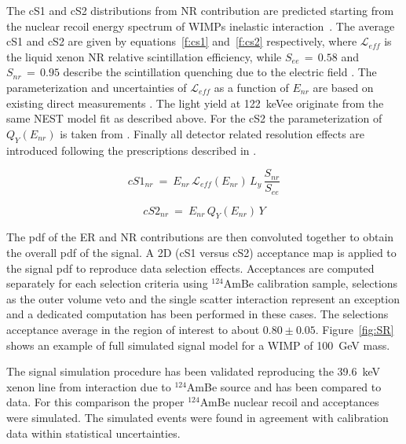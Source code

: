 The cS1 and cS2 distributions from NR contribution are predicted starting from the nuclear recoil energy spectrum
of WIMPs inelastic interaction~\cite{inelastic_th}. The average cS1 and cS2 are given by equations~\ref{f:cs1} and~\ref{f:cs2} respectively,
where $\mathcal{L}_{eff}$ is the liquid xenon NR relative scintillation efficiency, while $S_{ee} \, = \, 0.58$  and $S_{nr} \, = \, 0.95$ describe the scintillation 
quenching due to the electric field \cite{ScintQuenching}. The parameterization and uncertainties of $\mathcal{L}_{eff}$ as a function of $E_{nr}$ are based on existing 
direct measurements \cite{run8Result}. The light yield at 122~keVee originate from the same NEST model fit as described above. For the cS2 the parameterization 
of $Q_{Y}(E_{nr})$ is taken from \cite{QY}.
Finally all detector related resolution effects are introduced following the prescriptions described in \cite{dataAnalysis}.

\begin{equation}
cS1_{nr} ~=~ E_{nr} \, \mathcal{L}_{eff}(E_{nr}) \, L_{y} \, \frac{S_{nr}}{S_{ee}}
\label{f:cs1}
\end{equation}

\begin{equation}
cS2_{nr}  ~ = ~ E_{nr} \, Q_{Y}(E_{nr}) \, Y
\label{f:cs2}
\end{equation}

The pdf of the ER and NR contributions are then convoluted together to obtain the overall pdf of the signal.
A 2D (cS1 versus cS2) acceptance map is applied to the signal pdf to reproduce data selection effects. Acceptances are computed separately for each selection 
criteria using $^{124}$AmBe calibration sample, selections as the outer volume veto and the single scatter interaction represent an exception  and 
a dedicated computation has been performed in these cases. The selections acceptance average in the region of interest to about $0.80 \pm 0.05$. 
Figure~\ref{fig:SR} shows an example of full simulated signal model for a WIMP of 100~GeV mass. 

The signal simulation procedure has been validated reproducing the 39.6~keV xenon line from interaction due to
$^{124}$AmBe source and has been compared to data. For this comparison the proper  $^{124}$AmBe nuclear recoil and acceptances
were simulated. The simulated events were found in agreement  with calibration data within statistical uncertainties.

